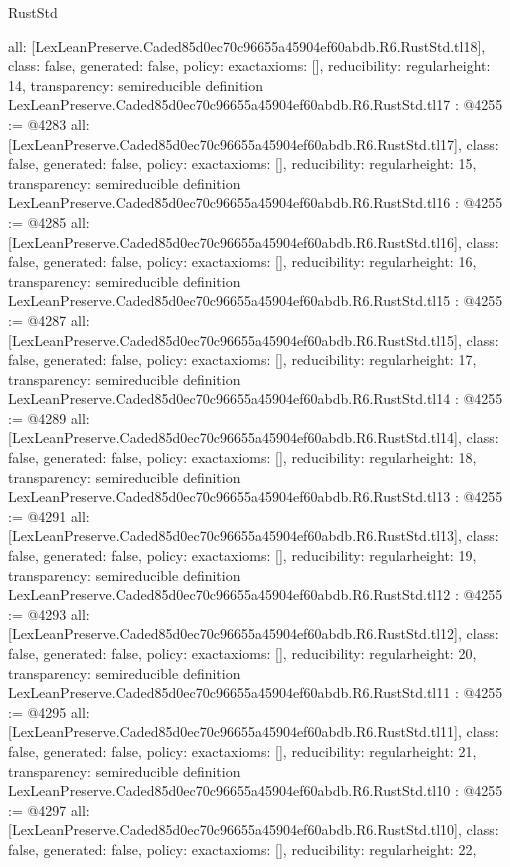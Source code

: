 \begin{lexlean}{RustStd}
\begin{coremodule}
{  all: [LexLeanPreserve.Caded85d0ec70c96655a45904ef60abdb.R6.RustStd.tl18],
  class: false,
  generated: false,
  policy: exact{axioms: []},
  reducibility: regular{height: 14},
  transparency: semireducible
}
definition LexLeanPreserve.Caded85d0ec70c96655a45904ef60abdb.R6.RustStd.tl17 : @4255 := @4283 {
  all: [LexLeanPreserve.Caded85d0ec70c96655a45904ef60abdb.R6.RustStd.tl17],
  class: false,
  generated: false,
  policy: exact{axioms: []},
  reducibility: regular{height: 15},
  transparency: semireducible
}
definition LexLeanPreserve.Caded85d0ec70c96655a45904ef60abdb.R6.RustStd.tl16 : @4255 := @4285 {
  all: [LexLeanPreserve.Caded85d0ec70c96655a45904ef60abdb.R6.RustStd.tl16],
  class: false,
  generated: false,
  policy: exact{axioms: []},
  reducibility: regular{height: 16},
  transparency: semireducible
}
definition LexLeanPreserve.Caded85d0ec70c96655a45904ef60abdb.R6.RustStd.tl15 : @4255 := @4287 {
  all: [LexLeanPreserve.Caded85d0ec70c96655a45904ef60abdb.R6.RustStd.tl15],
  class: false,
  generated: false,
  policy: exact{axioms: []},
  reducibility: regular{height: 17},
  transparency: semireducible
}
definition LexLeanPreserve.Caded85d0ec70c96655a45904ef60abdb.R6.RustStd.tl14 : @4255 := @4289 {
  all: [LexLeanPreserve.Caded85d0ec70c96655a45904ef60abdb.R6.RustStd.tl14],
  class: false,
  generated: false,
  policy: exact{axioms: []},
  reducibility: regular{height: 18},
  transparency: semireducible
}
definition LexLeanPreserve.Caded85d0ec70c96655a45904ef60abdb.R6.RustStd.tl13 : @4255 := @4291 {
  all: [LexLeanPreserve.Caded85d0ec70c96655a45904ef60abdb.R6.RustStd.tl13],
  class: false,
  generated: false,
  policy: exact{axioms: []},
  reducibility: regular{height: 19},
  transparency: semireducible
}
definition LexLeanPreserve.Caded85d0ec70c96655a45904ef60abdb.R6.RustStd.tl12 : @4255 := @4293 {
  all: [LexLeanPreserve.Caded85d0ec70c96655a45904ef60abdb.R6.RustStd.tl12],
  class: false,
  generated: false,
  policy: exact{axioms: []},
  reducibility: regular{height: 20},
  transparency: semireducible
}
definition LexLeanPreserve.Caded85d0ec70c96655a45904ef60abdb.R6.RustStd.tl11 : @4255 := @4295 {
  all: [LexLeanPreserve.Caded85d0ec70c96655a45904ef60abdb.R6.RustStd.tl11],
  class: false,
  generated: false,
  policy: exact{axioms: []},
  reducibility: regular{height: 21},
  transparency: semireducible
}
definition LexLeanPreserve.Caded85d0ec70c96655a45904ef60abdb.R6.RustStd.tl10 : @4255 := @4297 {
  all: [LexLeanPreserve.Caded85d0ec70c96655a45904ef60abdb.R6.RustStd.tl10],
  class: false,
  generated: false,
  policy: exact{axioms: []},
  reducibility: regular{height: 22},
}
\end{coremodule}
\end{lexlean}
